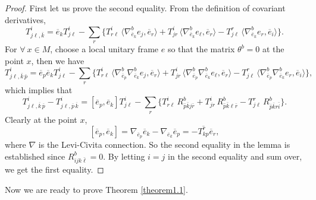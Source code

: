 \documentclass{amsart}
\numberwithin{equation}{section}
\theoremstyle{definition}
\renewcommand{\1}{\mathds{1}}
\renewcommand{\>}{\rightarrow}
\begin{document}
\begin{proof}
First let us prove the second equality. From the definition of covariant derivatives,
\[T_{j \ell,\bar{k}}^i= \overline{e}_k T_{j \ell}^i - \sum_r \{ T^i_{r\ell }\,\langle \nabla^b_{\overline{e}_k}e_j,\overline{e}_r \rangle  + T^i_{j r}\,\langle \nabla^b_{\overline{e}_k} e_{\ell},\overline{e}_r \rangle  - T^r_{j \ell}\,\langle \nabla^b_{\overline{e}_k}e_r, \overline{e}_i\rangle \} .\]
For $\forall\ x\in M$, choose a local unitary frame $e$ so that the matrix $\theta^b=0$ at the point $x$, then we have
\[T_{j \ell,\bar{k}\,\bar{p}}^i = \overline{e}_p\overline{e}_k T_{j \ell}^i -
\sum_r \{ T^i_{r\ell }\,\langle  \nabla^b_{\overline{e}_p}\nabla^b_{\overline{e}_k}e_j,\overline{e}_r \rangle  + T^i_{j r}\,\langle \nabla^b_{\overline{e}_p}\nabla^b_{\overline{e}_k} e_{\ell},\overline{e}_r\rangle   - T^r_{j \ell}\,\langle \nabla^b_{\overline{e}_p}\nabla^b_{\overline{e}_k}e_r,\overline{e}_i \rangle \} , \]
which implies that
\[ T^i_{j\ell , \overline{k} \, \overline{p}} - T^i_{j\ell , \overline{p} \, \overline{k} } =
[\overline{e}_p,\overline{e}_k] T_{j \ell}^i - \sum_r \{ T^i_{r\ell }\,R^b_{\bar{p}\bar{k}j\bar{r}} + T^i_{j r}\,R^b_{\bar{p} \bar{k} \ell \bar{r}} - T^r_{j \ell}\,R^b_{\bar{p}\bar{k}r\bar{i}} \} .\]
Clearly at the point $x$,
\[ [\overline{e}_p,\overline{e}_k ]= \nabla_{\overline{e}_p}\overline{e}_k-\nabla_{\overline{e}_k}\overline{e}_p = -\overline{T^r_{kp}} \overline{e}_r,\]
where $\nabla$ is the Levi-Civita connection. So the second equality in the lemma is established since $R^b_{ijk\bar{\ell}}=0$. By letting $i=j$ in the second equality and sum over, we get the first equality.
\end{proof}


Now we are ready to prove Theorem \ref{theorem1.1}.
\end{document}
